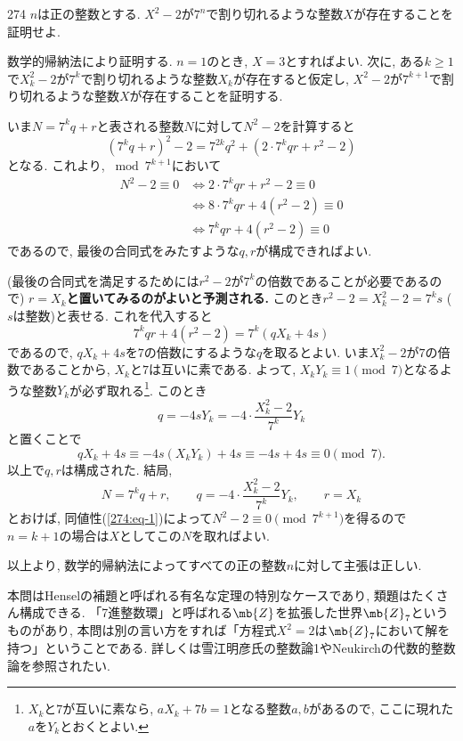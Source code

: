 \begin{thm}{274}{}{}
$n$は正の整数とする. $X^2-2$が$7^n$で割り切れるような整数$X$が存在することを証明せよ. 
\end{thm}

数学的帰納法により証明する. $n=1$のとき, $X=3$とすればよい. 次に, ある$k\geq 1$で$X_k^2 - 2$が$7^k$で割り切れるような整数$X_k$が存在すると仮定し, $X^2-2$が$7^{k+1}$で割り切れるような整数$X$が存在することを証明する. \par 
いま$N = 7^k q + r$と表される整数$N$に対して$N^2-2$を計算すると
\[
(7^k q+r)^2 - 2= 7^{2k} q^2 + (2\cdot 7^{k} qr + r^2 -2)
\]
となる. これより, $\bmod{7^{k+1}}$において
\begin{align}\label{274:eq-1}
N^2 - 2 \equiv 0 &\iff  2\cdot 7^k qr + r^2 - 2 \equiv 0 \\ \nonumber  
			&\iff 8\cdot 7^{k}qr + 4(r^2 - 2) \equiv 0 \\ \nonumber 
			&\iff 7^{k}qr + 4(r^2 - 2) \equiv 0 
\end{align} 
であるので, 最後の合同式をみたすような$q,r$が構成できればよい. \par
(最後の合同式を満足するためには$r^2-2$が$7^{k}$の倍数であることが必要であるので) \textbf{$r = X_k$と置いてみるのがよいと予測される.} このとき$r^2 - 2 = X_k^2 - 2 = 7^{k}s$ ($s$は整数)と表せる. これを代入すると
\[
7^{k} qr + 4(r^2 - 2) = 7^k(qX_k + 4s)
\]
であるので, $qX_k + 4s$を$7$の倍数にするような$q$を取るとよい. いま$X_{k}^2 - 2$が$7$の倍数であることから, $X_k$と$7$は互いに素である. よって, $X_kY_k \equiv 1\pmod{7}$となるような整数$Y_k$が必ず取れる\footnote{$X_k$と$7$が互いに素なら, $aX_k + 7b = 1$となる整数$a,b$があるので, ここに現れた$a$を$Y_k$とおくとよい. }. このとき
\[q = -4sY_k = -4\cdot \dfrac{X_k^2-2}{7^k}Y_k\]
と置くことで
\[
qX_k + 4s \equiv  -4s(X_kY_k) + 4s \equiv -4s + 4s \equiv 0\pmod{7}.
\]
以上で$q,r$は構成された. 結局,  
\[
N = 7^kq + r,\qquad q = -4\cdot \dfrac{X_k^2-2}{7^k}Y_k,\qquad r = X_k
\]
とおけば, 同値性(\ref{274:eq-1})によって$N^2 - 2\equiv 0\pmod{7^{k+1}}$を得るので$n=k+1$の場合は$X$としてこの$N$を取ればよい. \par 
以上より, 数学的帰納法によってすべての正の整数$n$に対して主張は正しい. 




\begin{supple}
本問はHenselの補題と呼ばれる有名な定理の特別なケースであり, 類題はたくさん構成できる. 「7進整数環」と呼ばれる$\mb{Z}$を拡張した世界$\mb{Z}_{7}$というものがあり, 本問は別の言い方をすれば「方程式$X^2 = 2$は$\mb{Z}_{7}$において解を持つ」ということである. 詳しくは雪江明彦氏の整数論1やNeukirchの代数的整数論を参照されたい. 
\end{supple}






